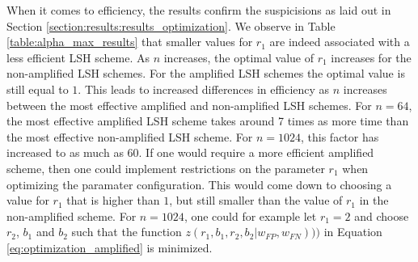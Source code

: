 When it comes to efficiency, the results confirm the suspicisions as laid out in Section \ref{section:results:results_optimization}. We observe in Table \ref{table:alpha_max_results} that smaller values for $r_1$ are indeed associated with a less efficient LSH scheme. As $n$ increases, the optimal value of $r_1$ increases for the non-amplified LSH schemes. For the amplified LSH schemes the optimal value is still equal to $1$. This leads to increased differences in efficiency as $n$ increases between the most effective amplified and non-amplified LSH schemes. For $n=64$, the most effective amplified LSH scheme takes around 7 times as more time than the most effective non-amplified LSH scheme. For $n=1024$, this factor has increased to as much as 60. If one would require a more efficient amplified scheme, then one could implement restrictions on the parameter $r_1$ when optimizing the paramater configuration. This would come down to choosing a value for $r_1$ that is higher than $1$, but still smaller than the value of $r_1$ in the non-amplified scheme. For $n=1024$, one could for example let $r_1=2$ and choose $r_2$, $b_1$ and $b_2$ such that the function $z(r_1,b_1,r_2,b_2| w_{FP}, w_{FN})))$ in Equation \ref{eq:optimization_amplified} is minimized.






